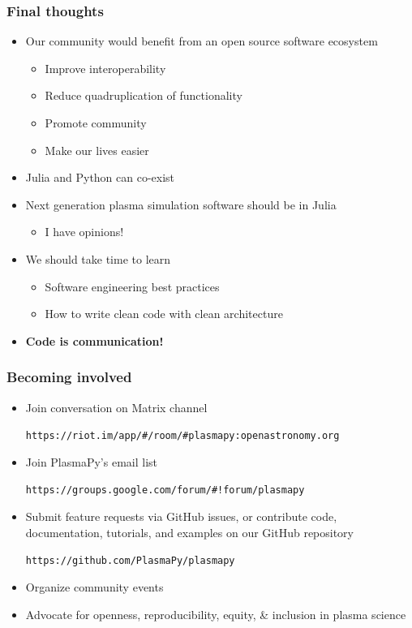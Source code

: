 \documentclass[default,compress]{beamer}
\begin{document}
\begin{frame}[plain]
    \frametitle{Final thoughts}
    \begin{itemize}
    \item Our community would benefit from an open source software ecosystem
        \begin{itemize}
        \item Improve interoperability
        \item Reduce quadruplication of functionality
        \item Promote community
        \item Make our lives easier
        \end{itemize}
    \item Julia and Python can co-exist
    \item Next generation plasma simulation software should be in Julia
        \begin{itemize}
        \item I have opinions!
        \end{itemize}
    \item We should take time to learn
        \begin{itemize}
        \item Software engineering best practices
        \item How to write clean code with clean architecture
        \end{itemize}
    \item \textbf{Code is communication!}
\end{itemize}
\end{frame}


\begin{frame}[plain]
    \frametitle{Becoming involved}
    \begin{itemize}

    \item Join conversation on Matrix channel
        \begin{center}
            {\color{blue}\small{
                \texttt{https://riot.im/app/\#/room/\#plasmapy:openastronomy.org}}}
        \end{center}
    \item Join PlasmaPy's email list
        \begin{center}
            {\color{blue}
            \small{\texttt{https://groups.google.com/forum/\#!forum/plasmapy}}
            }
        \end{center}
    \item Submit feature requests via GitHub issues, or contribute code, documentation, tutorials, and examples on our GitHub repository
        \begin{center}
            {\color{blue}
            \small{\texttt{https://github.com/PlasmaPy/plasmapy}}
            }
        \end{center}
    \item Organize community events
    \item Advocate for openness, reproducibility, equity, \& inclusion in plasma science
    \end{itemize}
\end{frame}
\end{document}
